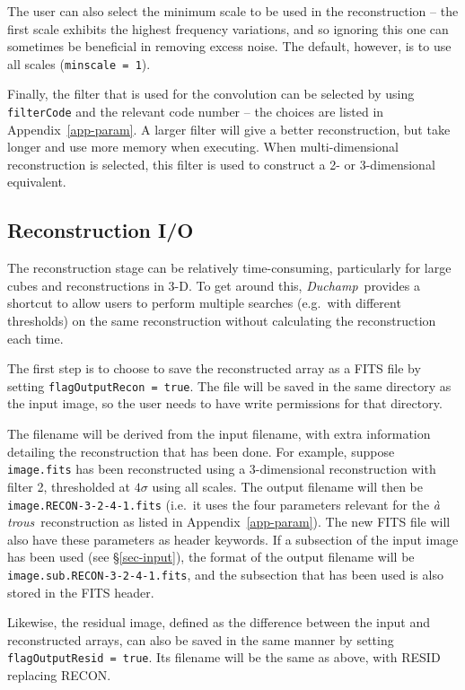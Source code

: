 \documentclass[12pt,a4paper]{article}
\newcommand{\eg}{e.g.\ }
\newcommand{\ie}{i.e.\ }
\newcommand{\duchamp}{\emph{Duchamp}}
\newcommand{\atrous}{\textit{{\`a} trous}}
\begin{document}
The user can also select the minimum scale to be used in the
reconstruction -- the first scale exhibits the highest frequency
variations, and so ignoring this one can sometimes be beneficial in
removing excess noise. The default, however, is to use all scales
(\texttt{minscale = 1}). 

Finally, the filter that is used for the convolution can be selected
by using \texttt{filterCode} and the relevant code number -- the
choices are listed in Appendix~\ref{app-param}. A larger filter will
give a better reconstruction, but take longer and use more memory when
executing. When multi-dimensional reconstruction is selected, this
filter is used to construct a 2- or 3-dimensional equivalent.

\subsection{Reconstruction I/O}
\label{sec-reconIO}

The reconstruction stage can be relatively time-consuming, particularly 
for large cubes and reconstructions in 3-D. To get around this, \duchamp\ 
provides a shortcut to allow users to perform multiple searches (\eg with 
different thresholds) on the same reconstruction without calculating the 
reconstruction each time.

The first step is to choose to save the reconstructed array as a FITS 
file by setting \texttt{flagOutputRecon = true}. The file will be saved 
in the same directory as the input image, so the user needs to have write 
permissions for that directory.

The filename will be derived from the input filename, with extra
information detailing the reconstruction that has been done. For
example, suppose \texttt{image.fits} has been reconstructed using a
3-dimensional reconstruction with filter 2, thresholded at $4\sigma$
using all scales. The output filename will then be
\texttt{image.RECON-3-2-4-1.fits} (\ie it uses the four parameters
relevant for the \atrous\ reconstruction as listed in
Appendix~\ref{app-param}). The new FITS file will also have these
parameters as header keywords. If a subsection of the input image has
been used (see \S\ref{sec-input}), the format of the output filename
will be \texttt{image.sub.RECON-3-2-4-1.fits}, and the subsection that
has been used is also stored in the FITS header.

Likewise, the residual image, defined as the difference between the input 
and reconstructed arrays, can also be saved in the same manner by setting 
\texttt{flagOutputResid = true}. Its filename will be the same as above, 
with RESID replacing RECON.
\end{document}
